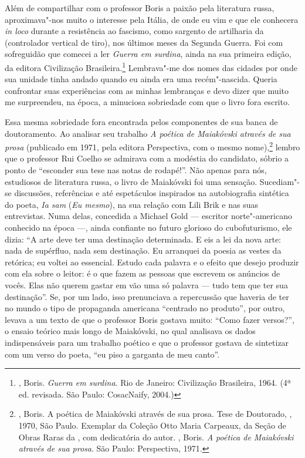 Além de compartilhar com o professor Boris a paixão pela literatura
russa, aproximava"-nos muito o interesse pela Itália, de onde eu vim e
que ele conhecera \emph{in loco} durante a resistência ao fascismo, como
sargento de artilharia da  (controlador vertical de tiro), nos
últimos meses da Segunda Guerra. Foi com sofreguidão que comecei a ler
\emph{Guerra em surdina}, ainda na sua primeira edição, da editora
Civilização Brasileira.\footnote{, Boris. \emph{Guerra em
  surdina}. Rio de Janeiro: Civilização Brasileira, 1964. (4ª ed.
  revisada. São Paulo: CosacNaify, 2004.)} Lembrava"-me dos nomes das
cidades por onde sua unidade tinha andado quando eu ainda era uma
recém"-nascida. Queria confrontar suas experiências com as minhas
lembranças e devo dizer que muito me surpreendeu, na época, a minuciosa
sobriedade com que o livro fora escrito.

Essa mesma sobriedade fora encontrada pelos componentes de sua banca de
doutoramento. Ao analisar seu trabalho \emph{A poética de Maiakóvski
através de sua prosa} (publicado em 1971, pela editora Perspectiva, com
o mesmo nome),\footnote{, Boris. A poética de Maiakóvski
  através de sua prosa. Tese de Doutorado, , 1970, São Paulo.
  Exemplar da Coleção Otto Maria Carpeaux, da Seção de Obras Raras da
  , com dedicatória do autor. , Boris. \emph{A poética de
  Maiakóvski através de sua prosa}. São Paulo: Perspectiva, 1971.}
lembro que o professor Rui Coelho se admirava com a modéstia do
candidato, sóbrio a ponto de ``esconder sua tese nas notas de rodapé!''.
Não apenas para nós, estudiosos de literatura russa, o livro de
Maiakóvski foi uma sensação. Sucediam"-se discussões, referências e até
espetáculos inspirados na autobiografia sintética do poeta, \emph{Ia
sam} (\emph{Eu mesmo}), na sua relação com Lili Brik e nas suas
entrevistas. Numa delas, concedida a Michael Gold --- escritor
norte"-americano conhecido na época ---, ainda confiante no futuro
glorioso do cubofuturismo, ele dizia: ``A arte deve ter uma destinação
determinada. E eis a lei da nova arte: nada de supérfluo, nada sem
destinação. Eu arranquei da poesia as vestes da retórica; eu voltei ao
essencial. Estudo cada palavra e o efeito que desejo produzir com ela
sobre o leitor: é o que fazem as pessoas que escrevem os anúncios de
vocês. Elas não querem gastar em vão uma só palavra --- tudo tem que ter
sua destinação''. Se, por um lado, isso prenunciava a repercussão que
haveria de ter no mundo o tipo de propaganda americana ``centrado no
produto'', por outro, levava a um texto de que o professor Boris gostava
muito: ``Como fazer versos?'', o ensaio teórico mais longo de
Maiakóvski, no qual analisava os dados indispensáveis para um trabalho
poético e que o professor gostava de sintetizar com um verso do poeta,
``eu piso a garganta de meu canto''.

